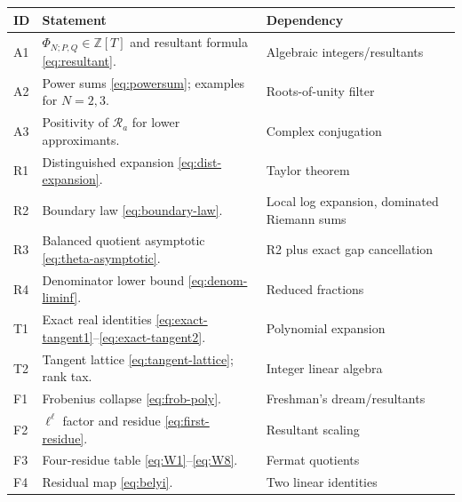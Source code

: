 \documentclass[11pt]{article}
\theoremstyle{definition}
\theoremstyle{remark}
\newcommand{\ZZ}{\mathbb Z}
\begin{document}
\begin{longtable}{p{}p{}p{}}
\toprule
ID & Statement & Dependency\\
\midrule
A1 & \(\Phi_{N;P,Q}\in\ZZ[T]\) and resultant formula \eqref{eq:resultant}. & Algebraic integers/resultants\\
A2 & Power sums \eqref{eq:powersum}; examples for \(N=2,3\). & Roots-of-unity filter\\
A3 & Positivity of \(\mathscr R_a\) for lower approximants. & Complex conjugation\\
R1 & Distinguished expansion \eqref{eq:dist-expansion}. & Taylor theorem\\
R2 & Boundary law \eqref{eq:boundary-law}. & Local log expansion, dominated Riemann sums\\
R3 & Balanced quotient asymptotic \eqref{eq:theta-asymptotic}. & R2 plus exact gap cancellation\\
R4 & Denominator lower bound \eqref{eq:denom-liminf}. & Reduced fractions\\
T1 & Exact real identities \eqref{eq:exact-tangent1}--\eqref{eq:exact-tangent2}. & Polynomial expansion\\
T2 & Tangent lattice \eqref{eq:tangent-lattice}; rank tax. & Integer linear algebra\\
F1 & Frobenius collapse \eqref{eq:frob-poly}. & Freshman's dream/resultants\\
F2 & \(\ell^\ell\) factor and residue \eqref{eq:first-residue}. & Resultant scaling\\
F3 & Four-residue table \eqref{eq:W1}--\eqref{eq:W8}. & Fermat quotients\\
F4 & Residual map \eqref{eq:belyi}. & Two linear identities\\
\bottomrule
\end{longtable}
\end{document}
